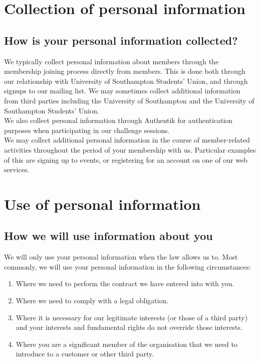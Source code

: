 \documentclass[12pt]{article}
\begin{document}
\section{Collection of personal information}

\subsection{How is your personal information collected?}

We typically collect personal information about members through the membership joining process directly from members. This is done both through our relationship with University of Southampton Students' Union, and through signups to our mailing list. We may sometimes collect additional information from third parties including the University of Southampton and the University of Southampton Students’ Union.\\
We also collect personal information through Authentik for authentication purposes when participating in our challenge sessions.\\
We may collect additional personal information in the course of member-related activities throughout the period of your membership with us. Particular examples of this are signing up to events, or registering for an account on one of our web services.

\section{Use of personal information}


\subsection{How we will use information about you}
We will only use your personal information when the law allows us to. Most commonly, we will use your personal information in the following circumstances:

\begin{enumerate}
\item Where we need to perform the contract we have entered into with you.
\item Where we need to comply with a legal obligation.
\item Where it is necessary for our legitimate interests (or those of a third party) and your interests and fundamental rights do not override those interests. 
\item Where you are a significant member of the organisation that we need to introduce to a customer or other third party.
\end{enumerate}
\end{document}
